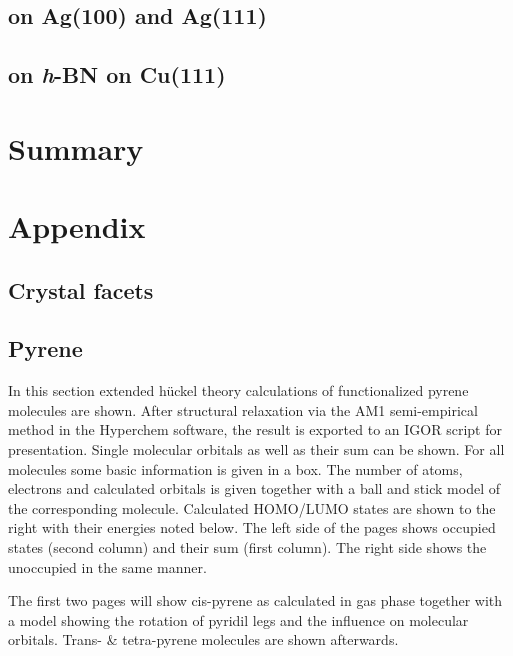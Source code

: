 \documentclass[
10pt,					%
a4paper,				%
twoside,				%
BCOR=8mm,				%
headings=normal,		%
headsepline,			%
footsepline,			%
plainfootsepline,		%
]{scrbook}
\begin{document}
\section{on Ag(100) and Ag(111)}
\section{on \textit{h}-BN on Cu(111)}

\chapter{Summary}
      
\backmatter{}
  \printbibliography  
\chapter{Appendix}
%  
\section{Crystal facets}
  
\section{Pyrene}
In this section extended hückel theory calculations of functionalized pyrene molecules are shown. After structural relaxation via the AM1 semi-empirical method in the Hyperchem software, the result is exported to an IGOR script for presentation. Single molecular orbitals as well as their sum can be shown. For all molecules some basic information is given in a box. The number of atoms, electrons and calculated orbitals is given together with a ball and stick model of the corresponding molecule. Calculated HOMO/LUMO states are shown to the right with their energies noted below.
The left side of the pages shows occupied states (second column) and their sum (first column). The right side shows the unoccupied in the same manner.

The first two pages will show cis-pyrene as calculated in gas phase together with a model showing the rotation of pyridil legs and the influence on molecular orbitals. Trans- \& tetra-pyrene molecules are shown afterwards.
\end{document}
